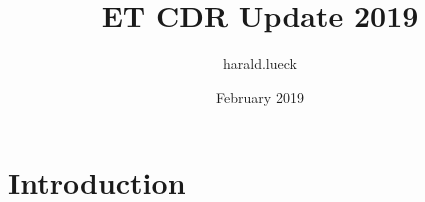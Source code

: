 \documentclass{article}
\title{ET CDR Update 2019}
\author{harald.lueck }
\date{February 2019}
\begin{document}
\maketitle

\section{Introduction}
\end{document}
